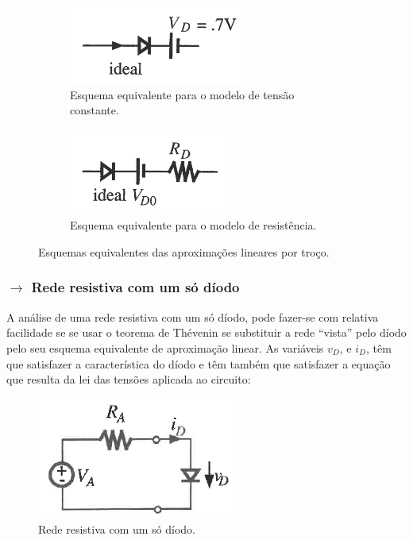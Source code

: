 \begin{figure}[ht] 
    \begin{subfigure}[b]{0.5\linewidth}
        \centering
        \includegraphics[width=0.5\linewidth]{img/2/tensao-const--esquema.png}
        \caption{Esquema equivalente para o modelo de tensão constante.} 
        \label{fig:tensao-const-esquema} 
        \vspace{1ex}
    \end{subfigure}%
    \begin{subfigure}[b]{0.5\linewidth}
        \centering
        \includegraphics[width=0.5\linewidth]{img/2/resi-esquema.png} 
        \caption{Esquema equivalente para o modelo de resistência.} 
        \label{fig:resi-esquema} 
        \vspace{1ex}
    \end{subfigure} 
    \caption{Esquemas equivalentes das aproximações lineares por troço.}
    \label{fig:esquema}
\end{figure}

\subsubsection[2.1.2 Rede resistiva com um só díodo]{$\pmb{\rightarrow}$ Rede resistiva com um só díodo}

\noindent A análise de uma rede resistiva com um só díodo, pode fazer-se com relativa facilidade se se usar o teorema de Thévenin se substituir a rede “vista” pelo díodo pelo seu esquema equivalente de aproximação linear. As variáveis $v_D$, e $i_D$, têm que satisfazer a característica do díodo e têm também que satisfazer a equação que resulta da lei das tensões aplicada ao circuito:

\vspace{-1 em}
\begin{figure}[H]
    \centering
    \includegraphics[width = 0.45\linewidth]{img/2/resi-diode-net.png}
    \caption{Rede resistiva com um só díodo.}
    \label{fig:resi-diode-net}
\end{figure}

